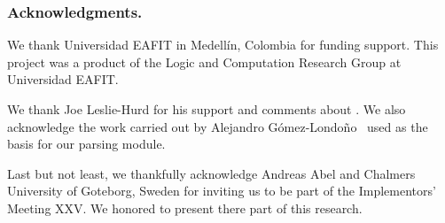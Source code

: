 \documentclass[../main.tex]{subfiles}
\begin{document}

\subsubsection*{Acknowledgments.}

We thank Universidad EAFIT in Medell\'in, Colombia for funding
support. This project was a product of the Logic and Computation
Research Group at Universidad EAFIT.

We thank Joe Leslie-Hurd for his support and comments about \Metis.
We also acknowledge the work carried out by Alejandro
G\'omez-Londo\~no~\cite{Gomez-Londono2015} used as the basis
for our \TSTP parsing module.

Last but not least, we thankfully acknowledge
Andreas Abel and Chalmers University of Goteborg, Sweden for
inviting us to be part of the \Agda Implementors’ Meeting XXV.
We honored to present there part of this research.
\end{document}
